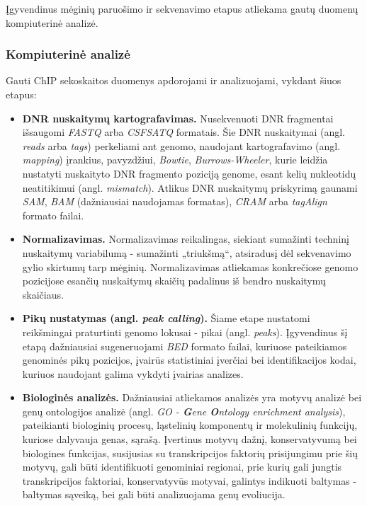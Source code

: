 \documentclass[12pt]{article}
\begin{document}
Įgyvendinus mėginių paruošimo ir sekvenavimo etapus atliekama gautų duomenų
kompiuterinė analizė.

\subsubsection{Kompiuterinė analizė}
Gauti ChIP sekoskaitos duomenys apdorojami ir analizuojami, vykdant šiuos
etapus:

\begin{itemize}
    \item \textbf{DNR nuskaitymų kartografavimas.} Nusekvenuoti DNR 
        fragmentai išsaugomi \emph{FASTQ} arba \emph{CSFSATQ} formatais. Šie DNR
        nuskaitymai (angl. \emph{reads} arba \emph{tags}) perkeliami ant genomo,
        naudojant kartografavimo (angl. \emph{mapping}) įrankius, pavyzdžiui,
        \emph{Bowtie}\cite{ARTICLE6}, \emph{Burrows-Wheeler}, kurie leidžia
        nustatyti nuskaityto DNR fragmento poziciją genome, esant kelių
        nukleotidų neatitikimui\cite{ARTICLE7} (angl. \emph{mismatch}). Atlikus
        DNR nuskaitymų priskyrimą gaunami \emph{SAM}, \emph{BAM} (dažniausiai
        naudojamas formatas), \emph{CRAM} arba \emph{tagAlign} formato failai.
    \item \textbf{Normalizavimas.} Normalizavimas reikalingas, siekiant
        sumažinti techninį nuskaitymų variabilumą - sumažinti „triukšmą“,
        atsiradusį dėl sekvenavimo gylio skirtumų tarp mėginių. Normalizavimas
        atliekamas konkrečiose genomo pozicijose esančių nuskaitymų skaičių
        padalinus iš bendro nuskaitymų skaičiaus\cite{ARTICLE17}.
    \item \textbf{Pikų nustatymas (angl. \emph{peak calling}).} Šiame etape
        nustatomi reikšmingai praturtinti genomo lokusai - pikai
        (angl. \emph{peaks}). Įgyvendinus šį etapą dažniausiai sugeneruojami
        \emph{BED} formato failai\cite{ARTICLE1}, kuriuose pateikiamos genominės
        pikų pozicijos, įvairūs statistiniai įverčiai bei identifikacijos kodai,
        kuriuos naudojant galima vykdyti įvairias analizes.
    \item \textbf{Biologinės analizės.} Dažniausiai atliekamos analizės yra
        motyvų analizė bei genų ontologijos analizė\cite{ARTICLE1}
        (angl. \emph{GO - \textbf{G}ene \textbf{O}ntology enrichment analysis}),
        pateikianti biologinių procesų, ląstelinių komponentų ir molekulinių
        funkcijų, kuriose dalyvauja genas, sąrašą. Įvertinus motyvų dažnį,
        konservatyvumą bei biologines funkcijas, susijusias su transkripcijos
        faktorių prisijungimu prie šių motyvų, gali būti identifikuoti
        genominiai regionai, prie kurių gali jungtis transkripcijos faktoriai,
        konservatyvūs motyvai, galintys indikuoti baltymas - baltymas sąveiką,
        bei gali būti analizuojama genų evoliucija.
\end{itemize}
\end{document}
